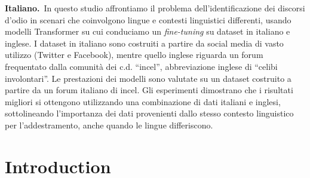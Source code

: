 \documentclass[11pt]{article}
\begin{document}
\begin{abstract-alt}
 \textrm{\bf{Italiano.}}~In questo studio affrontiamo il problema dell'identificazione dei discorsi d'odio in scenari che coinvolgono lingue e contesti linguistici differenti, usando modelli Transformer su cui conduciamo un \textit{fine-tuning} su dataset in italiano e inglese. I dataset in italiano sono costruiti a partire da social media di vasto utilizzo (Twitter e Facebook), mentre quello inglese riguarda un forum frequentato dalla comunità dei c.d. ``incel'', abbreviazione inglese di ``celibi involontari''. Le prestazioni dei modelli sono valutate su un dataset costruito a partire da un forum italiano di incel. Gli esperimenti dimostrano che i risultati migliori si ottengono utilizzando una combinazione di dati italiani e inglesi, sottolineando l'importanza dei dati provenienti dallo stesso contesto linguistico per l'addestramento, anche quando le lingue differiscono.
 
\end{abstract-alt}


\section{Introduction}
\end{document}
